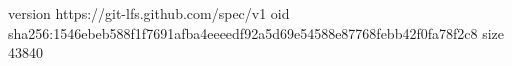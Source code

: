version https://git-lfs.github.com/spec/v1
oid sha256:1546ebeb588f1f7691afba4eeeedf92a5d69e54588e87768febb42f0fa78f2c8
size 43840
